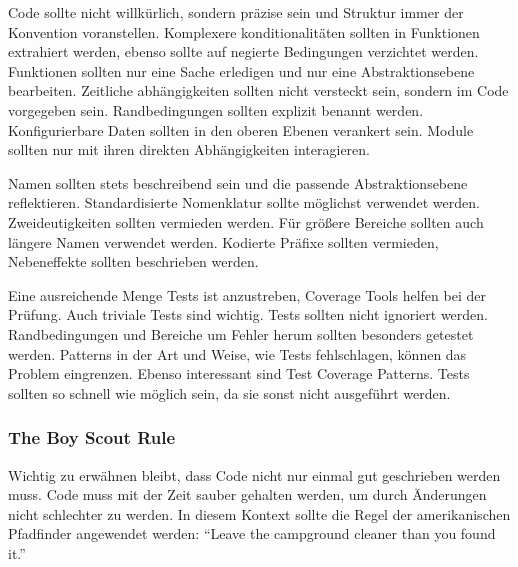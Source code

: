 Code sollte nicht willkürlich, sondern präzise sein und Struktur immer der Konvention voranstellen.
Komplexere konditionalitäten sollten in Funktionen extrahiert werden, ebenso sollte auf negierte Bedingungen verzichtet werden.
Funktionen sollten nur eine Sache erledigen und nur eine Abstraktionsebene bearbeiten.
Zeitliche abhängigkeiten sollten nicht versteckt sein, sondern im Code vorgegeben sein.
Randbedingungen sollten explizit benannt werden.
Konfigurierbare Daten sollten in den oberen Ebenen verankert sein.
Module sollten nur mit ihren direkten Abhängigkeiten interagieren.

Namen sollten stets beschreibend sein und die passende Abstraktionsebene reflektieren.
Standardisierte Nomenklatur sollte möglichst verwendet werden.
Zweideutigkeiten sollten vermieden werden.
Für größere Bereiche sollten auch längere Namen verwendet werden.
Kodierte Präfixe sollten vermieden, Nebeneffekte sollten beschrieben werden.

Eine ausreichende Menge Tests ist anzustreben, Coverage Tools helfen bei der Prüfung.
Auch triviale Tests sind wichtig.
Tests sollten nicht ignoriert werden.
Randbedingungen und Bereiche um Fehler herum sollten besonders getestet werden.
Patterns in der Art und Weise, wie Tests fehlschlagen, können das Problem eingrenzen.
Ebenso interessant sind Test Coverage Patterns.
Tests sollten so schnell wie möglich sein, da sie sonst nicht ausgeführt werden.

\subsubsection{The Boy Scout Rule}
Wichtig zu erwähnen bleibt, dass Code nicht nur einmal gut geschrieben werden muss.
Code muss mit der Zeit sauber gehalten werden, um durch Änderungen nicht schlechter zu werden.
In diesem Kontext sollte die Regel der amerikanischen Pfadfinder angewendet werden:
\enquote{Leave the campground cleaner than you found it.}
